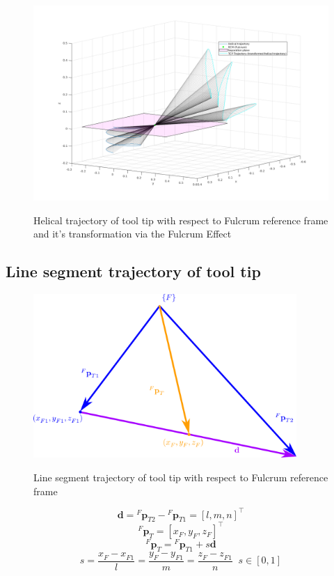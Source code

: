 \begin{center}
\begin{figure}[htbp]
\centering
\includegraphics[width=\textwidth]{images/rcm_trajectories/rcm_helical_traj.png}\\
\caption{Helical trajectory of tool tip with respect to Fulcrum reference frame and it's transformation via the Fulcrum Effect}
\end{figure}
\end{center}

\subsection{Line segment trajectory of tool tip}

\begin{center}
\begin{figure}[htbp]
\centering
\includegraphics[width=10cm]{images/line-segment-trajectory-wrt-fulcrum.png}\\
\caption{Line segment trajectory of tool tip with respect to Fulcrum reference frame}
\end{figure}
\end{center}
\[
\mathbf{d} = {}^{F}\mathbf{p}^{}_{T2} - {}^{F}\mathbf{p}^{}_{T1} = [l, m, n]^\top
\]
\[
{}^{F}\mathbf{p}^{}_{T} = [x^{}_{F}, y^{}_{F}, z^{}_{F}]^\top
\]
\[
{}^{F}\mathbf{p}^{}_{T} = {}^{F}\mathbf{p}^{}_{T1} + s\mathbf{d}
\]
\[
s = \frac{x^{}_{F} - x^{}_{F1}}{l} = \frac{y^{}_{F} - y^{}_{F1}}{m} = \frac{z^{}_{F} - z^{}_{F1}}{n} \;\; s \in [0, 1]
\]

